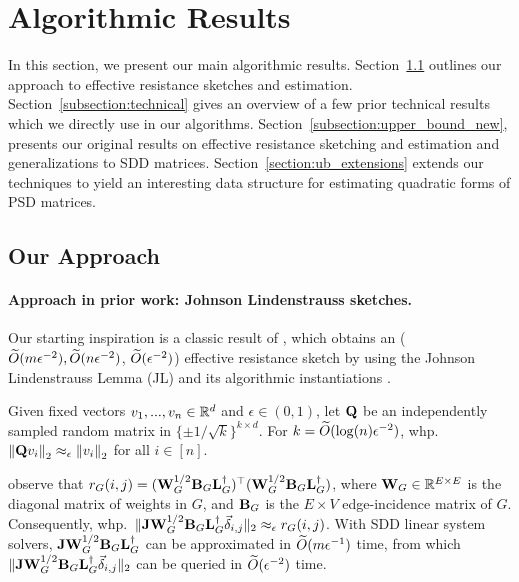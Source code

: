 \section{Algorithmic Results}\label{section:upper_bounds}

In this section, we present our main algorithmic results. Section~\ref{sec:ub_overview} outlines our approach to effective resistance sketches and estimation. Section~\ref{subsection:technical} gives an overview of a few prior technical results which we directly use in our algorithms. Section~\ref{subsection:upper_bound_new}, presents our original results on effective resistance sketching and estimation and generalizations to SDD matrices. Section~\ref{section:ub_extensions} extends our techniques to yield an interesting data structure for estimating quadratic forms of PSD matrices. 

\subsection{Our Approach}\label{sec:ub_overview}

\paragraph{Approach in prior work: Johnson Lindenstrauss sketches.} { Our starting inspiration is a classic result of \cite{spielman2009graph}, which obtains an ($\widetilde{O}( {m\epsilon^{-2}} ), \widetilde{O}( {n\epsilon^{-2}} )$, $\widetilde{O}( {\epsilon^{-2}} )$) effective resistance sketch by using the Johnson Lindenstrauss Lemma (JL) \cite{JL} and its algorithmic instantiations \cite{achlioptas}. 

\begin{lemma}\label{lemma:JL} Given fixed vectors $v_1, ..., v_n \in \mathbb{R}^d$ and $\epsilon \in (0, 1)$, let $\mathbf{Q}$ be an independently sampled random matrix in $\{\pm 1/\sqrt{k}\}^{k \times d}$. For $k = \widetilde{O}( {\log(n) \epsilon^{-2}} )$, whp.\ $\left\Vert \mathbf{Q} v_i \right\Vert_2 \approx_\epsilon \left\Vert v_i \right\Vert_2$ for all $i \in [n]$. 
\end{lemma}

\cite{spielman2009graph} observe that $r_G(i, j) = (\mathbf{W}_G^{1/2}\mathbf{B}_G\mathbf{L}_{G}^\dagger)^\top (\mathbf{W}_G^{1/2}\mathbf{B}_G\mathbf{L}_{G}^\dagger)$, where $\mathbf{W}_G \in \mathbb{R}^{E\times E}$ is the diagonal matrix of weights in $G$, and $\mathbf{B}_G$ is the $E \times V$ edge-incidence matrix of $G$. Consequently, whp.\ $\Vert \mathbf{J} \mathbf{W}_G^{1/2}\mathbf{B}_G\mathbf{L}_{G}^\dagger\vec{\delta}_{i,j} \Vert_2 \approx_\epsilon r_G(i, j)$. With SDD linear system solvers, $\mathbf{J}\mathbf{W}_G^{1/2}\mathbf{B}_G\mathbf{L}_{G}^\dagger$ can be approximated in $\widetilde{O}( {m\epsilon^{-1}} )$ time, from which $\Vert \mathbf{J}\mathbf{W}_G^{1/2}\mathbf{B}_G\mathbf{L}_{G}^\dagger \vec{\delta}_{i,j} \Vert_2$ can be queried in $\widetilde{O}( {\epsilon^{-2}} )$ time. }

